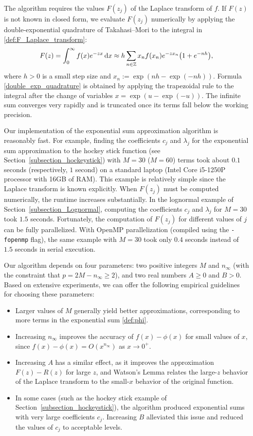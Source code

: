 \documentclass[12pt]{article}
\def\d{{\textnormal d}}
\begin{document}
The algorithm requires the values $F(z_j)$ of the Laplace transform of $f$. If $F(z)$ is not known in closed form, we evaluate $F(z_j)$ numerically by applying the double-exponential quadrature of Takahasi–Mori \cite{Takahasi_1974} to the integral in \eqref{def:F_Laplace_transform}: 
\begin{equation}\label{double_exp_quadrature}
F(z)=\int_0^{\infty} f(x) e^{-z x} \, \d x 
\approx h \sum_{n \in \mathbb{Z}}
x_n f(x_n) e^{-z x_n} \big(1+e^{-nh}\big),
\end{equation}
where $h>0$ is a small step size and $x_n:=\exp(nh-\exp(-nh))$.  
Formula \eqref{double_exp_quadrature} is obtained by applying the trapezoidal rule to the integral after the change of variables $x=\exp(u-\exp(-u))$. The infinite sum converges very rapidly and is truncated once its terms fall below the working precision.  

Our implementation of the exponential sum approximation algorithm is reasonably fast. For example, finding the coefficients $c_j$ and $\lambda_j$ for the exponential sum approximation to the hockey stick function (see Section~\ref{subsection_hockeystick}) with $M=30$ ($M=60$) terms took about $0.1$ seconds (respectively, $1$ second) on a standard laptop (Intel Core i5-1250P processor with 16GB of RAM). This example is relatively simple since the Laplace transform is known explicitly. When $F(z_j)$ must be computed numerically, the runtime increases substantially. In the lognormal example of Section~\ref{subsection_Lognormal}, computing the coefficients $c_j$ and $\lambda_j$ for $M=30$ took $1.5$ seconds. Fortunately, the computation of $F(z_j)$ for different values of $j$ can be fully parallelized. With OpenMP parallelization (compiled using the {\texttt{-fopenmp}} flag), the same example with $M=30$ took only $0.4$ seconds instead of $1.5$ seconds in serial execution.  


Our algorithm depends on four parameters: two positive integers $M$ and $n_{\infty}$ (with the constraint that $p=2M-n_{\infty} \ge 2$), and two real numbers $A\ge 0$ and $B>0$. Based on extensive experiments, we can offer the following empirical guidelines for choosing these parameters:  
\begin{itemize}
\item Larger values of $M$ generally yield better approximations, corresponding to more terms in the exponential sum \eqref{def:phi}.  
\item Increasing $n_{\infty}$ improves the accuracy of $f(x)-\phi(x)$ for small values of $x$, since $f(x)-\phi(x)=O(x^{n_{\infty}})$ as $x \to 0^+$.  
\item Increasing $A$ has a similar effect, as it improves the approximation $F(z)-R(z)$ for large $z$, and Watson’s Lemma relates the large-$z$ behavior of the Laplace transform to the small-$x$ behavior of the original function. 
\item In some cases (such as the hockey stick example of Section~\ref{subsection_hockeystick}), the algorithm produced exponential sums with very large coefficients $c_j$. Increasing $B$ alleviated this issue and reduced the values of $c_j$ to acceptable levels.  
\end{itemize}
\end{document}
